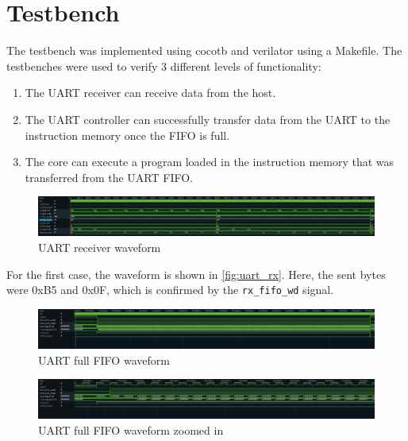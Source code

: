 \section{Testbench}

The testbench was implemented using cocotb and verilator using a Makefile. The testbenches were used to verify 3 different levels of functionality:

\begin{enumerate}
    \item The UART receiver can receive data from the host.
    \item The UART controller can successfully transfer data from the UART to the instruction memory once the FIFO is full.
    \item The core can execute a program loaded in the instruction memory that was transferred from the UART FIFO.
\end{enumerate}

\begin{figure}[H]
    \centering
    \includegraphics[width=\textwidth]{media/uart_rx}
    \caption{UART receiver waveform}
    \label{fig:uart_rx}
\end{figure}

For the first case, the waveform is shown in \autoref{fig:uart_rx}.
Here, the sent bytes were 0xB5 and 0x0F, which is confirmed by the \texttt{rx\_fifo\_wd} signal.

\begin{figure}[H]
    \centering
    \includegraphics[width=\textwidth]{media/uart_full_fifo}
    \caption{UART full FIFO waveform}
    \label{fig:uart_full_fifo}
\end{figure}

\begin{figure}[H]
    \centering
    \includegraphics[width=\textwidth]{media/uart_full_fifo_zoomed}
    \caption{UART full FIFO waveform zoomed in}
    \label{fig:uart_full_fifo_zoomed}
\end{figure}

